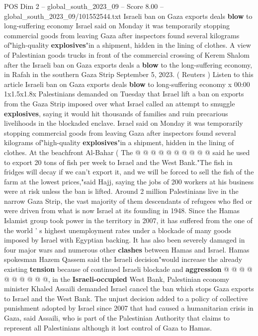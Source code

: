 \begin{textsample}{POS Dim 2 – global\_south\_2023\_09 – Score 8.00 – global\_south\_2023\_09/101552544.txt}  \label{ex:f2_pos_443}
Israeli ban on Gaza exports deals \textbf{blow} to long-suffering economy Israel said on Monday it was temporarily stopping commercial goods from leaving Gaza after inspectors found several kilograms of"high-quality \textbf{explosives}"in a shipment, hidden in the lining of clothes.
A view of Palestinian goods trucks in front of the commercial crossing of Kerem Shalom after the Israeli ban on Gaza exports deals a \textbf{blow} to the long-suffering economy, in Rafah in the southern Gaza Strip September 5, 2023. ( Reuters ) Listen to this article Israeli ban on Gaza exports deals \textbf{blow} to long-suffering economy x 00:00 1x1.5x1.8x Palestinians demanded on Tuesday that Israel lift a ban on exports from the Gaza Strip imposed over what Israel called an attempt to smuggle \textbf{explosives}, saying it would hit thousands of families and ruin precarious livelihoods in the blockaded enclave.
Israel said on Monday it was temporarily stopping commercial goods from leaving Gaza after inspectors found several kilograms of"high-quality \textbf{explosives}"in a shipment, hidden in the lining of clothes.
At the beachfront Al-Bahar ( The @ @ @ @ @ @ @ @ @ @ said he used to export 20 tons of fish per week to Israel and the West Bank."The fish in fridges will decay if we can't export it, and we will be forced to sell the fish of the farm at the lowest prices,"said Hajj, saying the jobs of 200 workers at his business were at risk unless the ban is lifted.
Around 2 million Palestinians live in the narrow Gaza Strip, the vast majority of them descendants of refugees who fled or were driven from what is now Israel at its founding in 1948.
Since the Hamas Islamist group took power in the territory in 2007, it has suffered from the one of the world ' s highest unemployment rates under a blockade of many goods imposed by Israel with Egyptian backing.
It has also been severely damaged in four major wars and numerous other \textbf{clashes} between Hamas and Israel.
Hamas spokesman Hazem Qassem said the Israeli decision"would increase the already existing \textbf{tension} because of continued Israeli blockade and \textbf{aggression} @ @ @ @ @ @ @ @ @ @, in the \textbf{Israeli-occupied} West Bank, Palestinian economy minister Khaled Assaili demanded Israel cancel the ban which stops Gaza exports to Israel and the West Bank.
The unjust decision added to a policy of collective punishment adopted by Israel since 2007 that had caused a humanitarian crisis in Gaza, said Assaili, who is part of the Palestinian Authority that claims to represent all Palestinians although it lost control of Gaza to Hamas.

\end{textsample}

